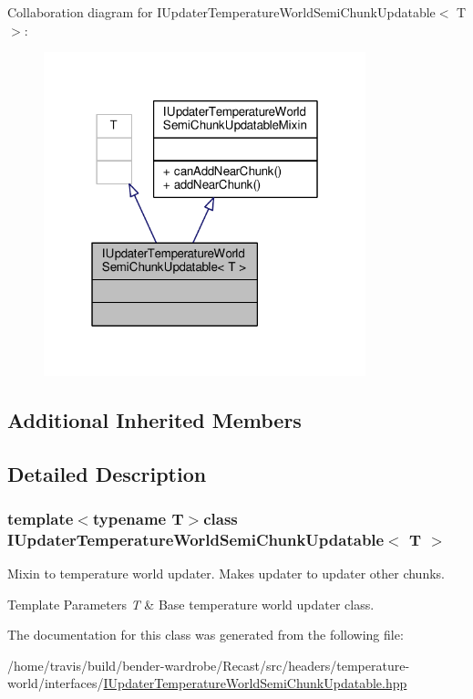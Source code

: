 Collaboration diagram for I\-Updater\-Temperature\-World\-Semi\-Chunk\-Updatable$<$ T $>$\-:
\nopagebreak
\begin{figure}[H]
\begin{center}
\leavevmode
\includegraphics[width=265pt]{class_i_updater_temperature_world_semi_chunk_updatable__coll__graph}
\end{center}
\end{figure}
\subsection*{Additional Inherited Members}


\subsection{Detailed Description}
\subsubsection*{template$<$typename T$>$class I\-Updater\-Temperature\-World\-Semi\-Chunk\-Updatable$<$ T $>$}

Mixin to temperature world updater. Makes updater to updater other chunks.


\begin{DoxyTemplParams}{Template Parameters}
{\em T} & Base temperature world updater class. \\
\hline
\end{DoxyTemplParams}


The documentation for this class was generated from the following file\-:\begin{DoxyCompactItemize}
\item 
/home/travis/build/bender-\/wardrobe/\-Recast/src/headers/temperature-\/world/interfaces/\hyperlink{_i_updater_temperature_world_semi_chunk_updatable_8hpp}{I\-Updater\-Temperature\-World\-Semi\-Chunk\-Updatable.\-hpp}\end{DoxyCompactItemize}
